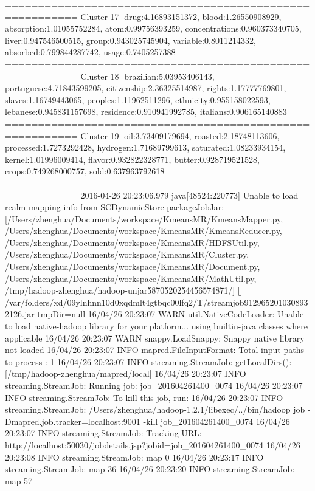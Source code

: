 ========================================================= 
Cluster 17| drug:4.16893151372, blood:1.26550908929, absorption:1.01055752284, atom:0.99756393259, concentrations:0.960373340705, liver:0.947546500515, group:0.943025745904, variable:0.8011214332, absorbed:0.799844287742, usage:0.7405257388
========================================================= 
Cluster 18| brazilian:5.03953406143, portuguese:4.71843599205, citizenship:2.36325514987, rights:1.17777769801, slaves:1.16749443065, peoples:1.11962511296, ethnicity:0.955158022593, lebanese:0.945831157698, residence:0.910941992785, italians:0.906165140883
========================================================= 
Cluster 19| oil:3.73409179694, roasted:2.18748113606, processed:1.7273292428, hydrogen:1.71689799613, saturated:1.08233934154, kernel:1.01996009414, flavor:0.932822328771, butter:0.928719521528, crops:0.749268000757, sold:0.637963792618
========================================================= 
2016-04-26 20:23:06.979 java[48524:220773] Unable to load realm mapping info from SCDynamicStore
packageJobJar: [/Users/zhenghua/Documents/workspace/KmeansMR/KmeansMapper.py, /Users/zhenghua/Documents/workspace/KmeansMR/KmeansReducer.py, /Users/zhenghua/Documents/workspace/KmeansMR/HDFSUtil.py, /Users/zhenghua/Documents/workspace/KmeansMR/Cluster.py, /Users/zhenghua/Documents/workspace/KmeansMR/Document.py, /Users/zhenghua/Documents/workspace/KmeansMR/MathUtil.py, /tmp/hadoop-zhenghua/hadoop-unjar5870520254456574871/] [] /var/folders/xd/09ylnhnn10d0xqdmlt4gtbqc00lfq2/T/streamjob9129652010308932126.jar tmpDir=null
16/04/26 20:23:07 WARN util.NativeCodeLoader: Unable to load native-hadoop library for your platform... using builtin-java classes where applicable
16/04/26 20:23:07 WARN snappy.LoadSnappy: Snappy native library not loaded
16/04/26 20:23:07 INFO mapred.FileInputFormat: Total input paths to process : 1
16/04/26 20:23:07 INFO streaming.StreamJob: getLocalDirs(): [/tmp/hadoop-zhenghua/mapred/local]
16/04/26 20:23:07 INFO streaming.StreamJob: Running job: job_201604261400_0074
16/04/26 20:23:07 INFO streaming.StreamJob: To kill this job, run:
16/04/26 20:23:07 INFO streaming.StreamJob: /Users/zhenghua/hadoop-1.2.1/libexec/../bin/hadoop job  -Dmapred.job.tracker=localhost:9001 -kill job_201604261400_0074
16/04/26 20:23:07 INFO streaming.StreamJob: Tracking URL: http://localhost:50030/jobdetails.jsp?jobid=job_201604261400_0074
16/04/26 20:23:08 INFO streaming.StreamJob:  map 0%
16/04/26 20:23:17 INFO streaming.StreamJob:  map 36%
16/04/26 20:23:20 INFO streaming.StreamJob:  map 57%
